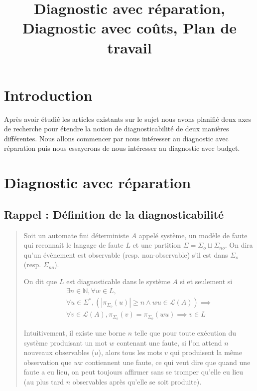 \documentclass[a4paper,10pt]{article}
\title{Diagnostic avec réparation, Diagnostic avec co\^uts, Plan de travail}
\date{}
\begin{document}
\maketitle

\section*{Introduction}

Après avoir étudié les articles existants sur le sujet nous avons planifié deux axes de recherche pour étendre la notion de diagnosticabilité de deux manières différentes. Nous allons commencer par nous intéresser au diagnostic avec réparation puis nous essayerons de nous intéresser au diagnostic avec budget.

\section{Diagnostic avec r\'eparation}
\subsection{Rappel : Définition de la diagnosticabilité}
\begin{quote}
Soit un automate fini d\'eterministe $A$ appel\'e syst\`eme, un modèle de faute qui reconnait le langage de faute $L$ et une partition $\Sigma=\Sigma_o\sqcup \Sigma_{no}$. On dira qu'un \'ev\`enement est observable (resp. non-observable) s'il est dans $\Sigma_o$ (resp. $\Sigma_{no}$).

On dit que $L$ est diagnosticable dans le système $A$  si et seulement si $$\begin{array}{l}
\exists n \in \mathbb N, \forall w \in L,\\
\forall u \in \Sigma^*, \left(\left|\pi_{\Sigma_o}(u)\right|\ge n \land wu \in \mathcal L(A)\right) \implies\\
\forall v \in \mathcal L(A), \pi_{\Sigma_o}(v)=\pi_{\Sigma_o}(wu) \implies v \in L
\end{array}$$

Intuitivement, il existe une borne $n$ telle que pour toute ex\'ecution du système produisant un mot $w$ contenant une faute, si l'on attend $n$ nouveaux observables ($u$), alors tous les mots $v$ qui produisent la m\^eme observation que $wx$ contiennent une faute, ce qui veut dire que quand une faute a eu lieu, on peut toujours affirmer sans se tromper qu'elle eu lieu (au plus tard $n$ observables après qu'elle se soit produite).
\end{quote}
\end{document}
